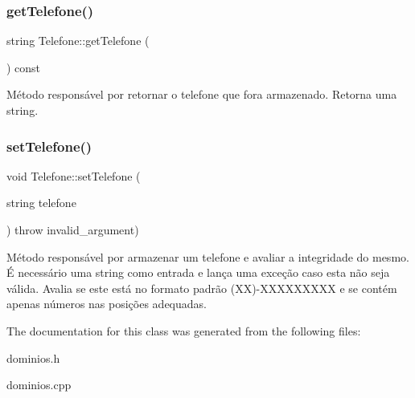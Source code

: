 \subsubsection{\texorpdfstring{get\+Telefone()}{getTelefone()}}
{\footnotesize\ttfamily string Telefone\+::get\+Telefone (\begin{DoxyParamCaption}{ }\end{DoxyParamCaption}) const\hspace{0.3cm}{\ttfamily [inline]}}

Método responsável por retornar o telefone que fora armazenado. Retorna uma string. \mbox{\label{classTelefone_a79516b37434ff927bd2a9bd66080a36d}} 
\subsubsection{\texorpdfstring{set\+Telefone()}{setTelefone()}}
{\footnotesize\ttfamily void Telefone\+::set\+Telefone (\begin{DoxyParamCaption}\item[{string}]{telefone }\end{DoxyParamCaption}) throw  invalid\+\_\+argument) }

Método responsável por armazenar um telefone e avaliar a integridade do mesmo. É necessário uma string como entrada e lança uma exceção caso esta não seja válida. Avalia se este está no formato padrão (XX)-\/\+X\+X\+X\+X\+X\+X\+X\+XX e se contém apenas números nas posições adequadas. 

The documentation for this class was generated from the following files\+:\begin{DoxyCompactItemize}
\item 
dominios.\+h\item 
dominios.\+cpp\end{DoxyCompactItemize}
